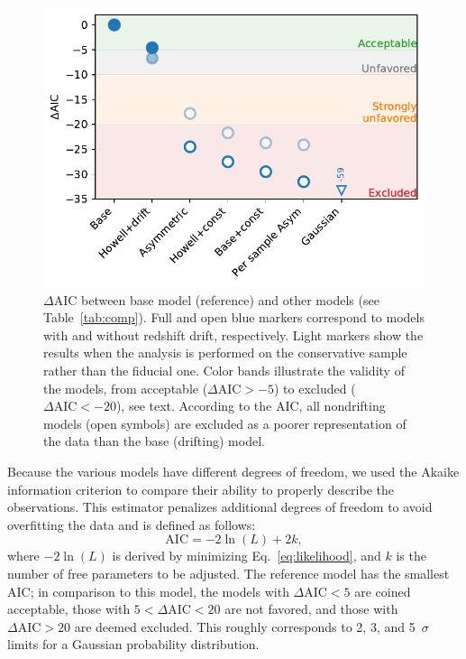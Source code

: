 \documentclass[]{aa}
\begin{document}
\begin{figure}
    \centering
    \includegraphics[width=\linewidth]{Article_figures/mod_comp.pdf}
    \caption{$\Delta$AIC between base model (reference) and other models (see
        Table~\ref{tab:comp}). Full and open blue markers correspond to models
        with and without redshift drift, respectively. Light markers show the
        results when the analysis is performed on the conservative sample rather
        than the fiducial one. Color bands illustrate the validity of the
        models, from acceptable ($\Delta\mathrm{AIC} > -5$) to excluded
        ($\Delta\mathrm{AIC} < -20$), see text. According to the AIC, all
    nondrifting models (open symbols) are excluded as a poorer representation of
the data than the base (drifting) model.}
    \label{fig:mod_comp}
\end{figure}

Because the various models have different degrees of freedom, we used the Akaike
information criterion \citep[AIC, e.g.,][]{burnham2004} to compare their ability
to properly describe the observations. This estimator penalizes additional
degrees of freedom to avoid overfitting the data and is defined as follows:
\begin{equation}
    \mathrm{AIC} = -2\ln(L) + 2k,
\end{equation}
where $-2\ln(L)$ is derived by minimizing Eq.~\eqref{eq:likelihood}, and $k$ is
the number of free parameters to be adjusted. The reference model has the
smallest AIC; in comparison to this model, the models with
$\Delta\mathrm{AIC}<5$ are coined acceptable, those with
$5<\Delta\mathrm{AIC}<20$ are not favored, and those with
$\Delta\mathrm{AIC}>20$ are deemed excluded. This roughly corresponds to 2, 3,
and 5~$\sigma$ limits for a Gaussian probability distribution. 
\end{document}
